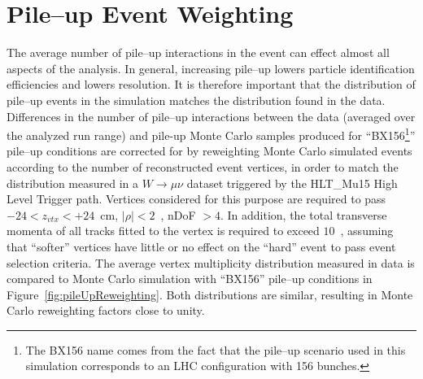 \section{Pile--up Event Weighting}
\label{sec:PUweighting}
The average number of pile--up interactions in the event can effect almost all
aspects of the analysis.  In general, increasing pile--up lowers particle
identification efficiencies and lowers \MET resolution.  It is therefore
important that the distribution of pile--up events in the simulation matches the
distribution found in the data.  Differences in the number of pile--up
interactions between the data (averaged over the analyzed run range) and
pile-up Monte Carlo samples produced for ``BX156\footnote{The BX156 name comes
from the fact that the pile--up scenario used in this simulation corresponds to
an LHC configuration with 156 bunches.}'' pile--up conditions are corrected for
by reweighting Monte Carlo simulated events according to the number of
reconstructed event vertices, in order to match the distribution measured in a
$W \to \mu \nu$ dataset triggered by the HLT\_Mu15 High Level Trigger path.
Vertices considered for this purpose are required to pass $-24 < z_{vtx} <
+24$~cm, $\left| \rho \right| < 2$~\centi\meter, nDoF $> 4$.  In addition, the
total transverse momenta of all tracks fitted to the vertex is required to
exceed $10$~\GeVc, assuming that ``softer'' vertices have little or no effect on
the ``hard'' event to pass event selection criteria.  The average vertex
multiplicity distribution measured in data is compared to Monte Carlo simulation
with ``BX156'' pile--up conditions in Figure~\ref{fig:pileUpReweighting}.  Both
distributions are similar, resulting in Monte Carlo reweighting factors close to
unity.
%
